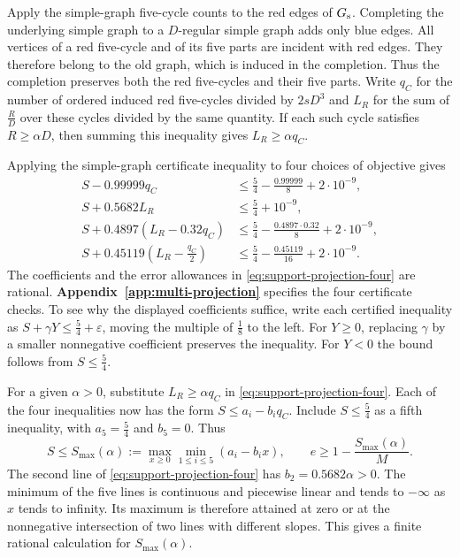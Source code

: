 \documentclass[preprint,11pt,numbers]{elsarticle-arxiv}
\numberwithin{equation}{section}
\theoremstyle{definition}
\begin{document}
Apply the simple-graph five-cycle counts to the red edges of
$G_{\rm s}$. Completing the underlying simple graph to a $D$-regular simple
graph adds only blue edges. All vertices of a red five-cycle and of
its five parts are incident with red edges. They therefore belong
to the old graph, which is induced in the completion. Thus the
completion preserves both the red five-cycles and their five
parts. Write $q_C$ for the number of ordered induced red five-cycles
divided by $2sD^3$ and $L_R$ for the sum of $\frac RD$ over these
cycles divided by the same quantity. If each such cycle satisfies
$R\geq\alpha D$, then summing this inequality gives $L_R\geq\alpha q_C$.

Applying the simple-graph certificate inequality to four choices
of objective gives
\begin{equation}\label{eq:support-projection-four}
\begin{aligned}
 S-0.99999q_C
   &\le \frac{5}{4}-\frac{0.99999}{8}+2\cdot10^{-9},\\
 S+0.5682L_R
   &\le \frac{5}{4}+10^{-9},\\
 S+0.4897(L_R-0.32q_C)
   &\le \frac{5}{4}-\frac{0.4897\cdot0.32}{8}+2\cdot10^{-9},\\
 S+0.45119\left(L_R-\frac{q_C}{2}\right)
   &\le \frac{5}{4}-\frac{0.45119}{16}+2\cdot10^{-9}.
\end{aligned}
\end{equation}
The coefficients and the error allowances in
\eqref{eq:support-projection-four} are rational.
\textbf{Appendix~\ref{app:multi-projection}} specifies the
four certificate checks. To see why the displayed coefficients
suffice, write each certified inequality as $S+\gamma Y\leq
\frac54+\varepsilon$, moving the multiple of $\frac18$ to the left.
For $Y\geq0$, replacing $\gamma$ by a smaller nonnegative coefficient
preserves the inequality. For $Y<0$ the bound follows from
$S\leq\frac54$.

For a given $\alpha>0$, substitute $L_R\geq\alpha q_C$ in
\eqref{eq:support-projection-four}. Each of the four inequalities
now has the form $S\leq a_i-b_iq_C$. Include $S\leq\frac54$ as
a fifth inequality, with $a_5=\frac54$ and $b_5=0$. Thus
\[
 S\leq S_{\max}(\alpha):=
 \max_{x\geq0}\min_{1\leq i\leq5}(a_i-b_ix),
 \qquad e\geq1-\frac{S_{\max}(\alpha)}{M}.
\]
The second line of \eqref{eq:support-projection-four} has
$b_2=0.5682\alpha>0$. The minimum of the five lines is continuous
and piecewise linear and tends to $-\infty$ as $x$ tends to infinity.
Its maximum is therefore attained at zero or at the nonnegative
intersection of two lines with different slopes. This gives a finite
rational calculation for $S_{\max}(\alpha)$.
\end{document}
